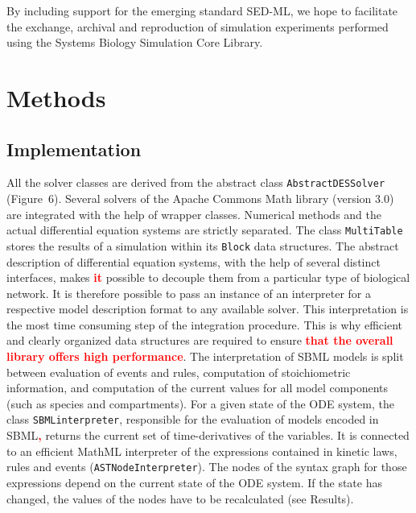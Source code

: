 \documentclass[10pt]{bmc_article}
\newenvironment{bmcformat}{\baselineskip20pt\sloppy\setboolean{publ}{false}}{\baselineskip20pt\sloppy}
\newcommand{\TODO}[1]{\textcolor{red}{\textbf{#1}}}
\newcommand{\AbstractDESSolver}{\texttt{Abstract\-DES\-Solver}}
\newcommand{\SBMLinterpreter}{\texttt{SBML\-interpreter}}
\newcommand{\MultiTable}{\texttt{Multi\-Table}}
\newcommand{\Block}{\texttt{Block}}
\newcommand{\ASTNodeInterpreter}{\texttt{ASTNode\-In\-terpreter}}
\begin{document}
\begin{bmcformat}

By including support for the emerging standard SED-ML, we hope to facilitate the
exchange, archival and reproduction of simulation experiments performed using
the Systems Biology Simulation Core Library.

\section*{Methods}

\subsection*{Implementation}

All the solver classes are derived from the abstract class \AbstractDESSolver{}
(Figure~6).
Several solvers of the Apache Commons Math library (version 3.0) are integrated
with the help of wrapper classes. Numerical methods and the actual differential
equation systems are strictly separated. The class \MultiTable{} stores the
results of a simulation within its \Block{} data structures. 
%
The abstract description of differential equation systems, with the help of
several distinct interfaces, makes \TODO{it} possible to decouple them from a particular
type of biological network. It is therefore possible to pass an instance of an
interpreter for a respective model description format to any available solver.
%
This interpretation is the most time consuming step of the integration procedure.
This is why efficient and clearly organized data structures are required to
ensure \TODO{that the overall library offers high performance}. The interpretation of SBML
models is split between evaluation of events and rules, computation of
stoichiometric information, and computation of the current values for all model
components (such as species and compartments).
%
For a given state of the ODE system, the class \SBMLinterpreter{}, responsible
for the evaluation of models encoded in SBML\TODO{,} returns the current set of
time-derivatives of the variables.
It is connected to an efficient MathML interpreter of the expressions contained
in kinetic laws, rules and events (\ASTNodeInterpreter{}). The nodes of the syntax graph for those
expressions depend on the current state of the ODE system. If the state has
changed, the values of the nodes have to be recalculated (see Results).


\end{bmcformat}
\end{document}
